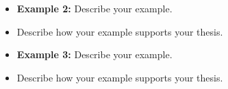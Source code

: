 \begin{enumerate}
\begin{itemize}
\hrulefill

\item \textbf{Example 2:} Describe your example. \hrulefill

\hrulefill

\item Describe how your example supports your thesis. \hrulefill

\hrulefill

\item \textbf{Example 3:} Describe your example. \hrulefill

\hrulefill

\item Describe how your example supports your thesis. \hrulefill

\hrulefill

\end{itemize}

\end{enumerate} 


